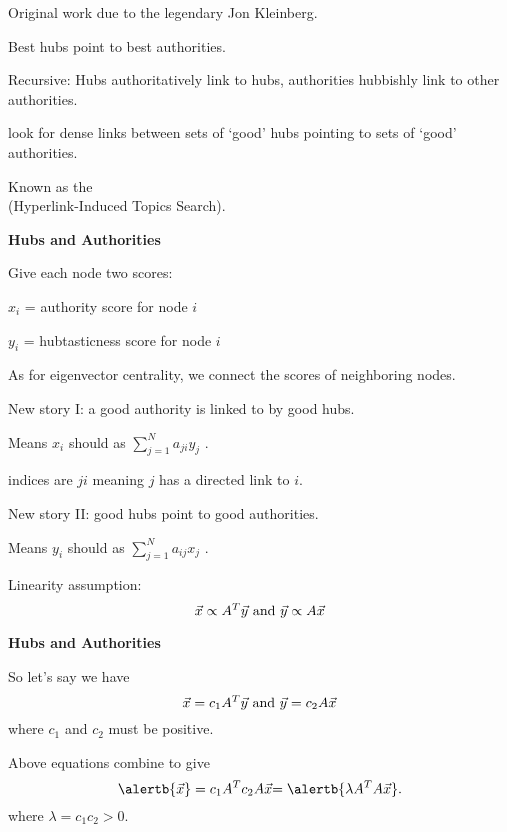    Original work due to 
    the legendary Jon Kleinberg.\cite{kleinberg1998a}
  
    Best hubs point to best authorities.
  
    \alert{Recursive:} 
    Hubs authoritatively link to hubs, 
    authorities hubbishly link to other authorities.
  
     look for dense links
    between sets of `good' hubs pointing to sets of 
    `good' authorities.
  
    Known as the
    \\
    (Hyperlink-Induced Topics Search).
  


  \textbf{Hubs and Authorities}

  
  
    Give each node two scores:
    
     
      \alert{$x_i$} = \alert{authority score} for node $i$
     
      \alert{$y_i$} = \alert{hubtasticness score} for node $i$
    
  
    As for eigenvector centrality, we connect
    the scores of neighboring nodes.
  
    New story I: a good authority is linked to by good hubs.
  
    Means
    \alert{$x_i$} should  as
    \alert{$\sum_{j=1}^{N} a_{ji} y_j$} .
  
     indices are $ji$ meaning
    $j$ has a directed link to $i$.
  
    New story II: good hubs point to good authorities.
  
    Means
    \alert{$y_i$} should  as
    \alert{$\sum_{j=1}^{N} a_{ij} x_j$} .
  
    Linearity assumption:
    $$
    \vec{x} \propto A^{T} \vec{y}
    \ \textnormal{and} \
    \vec{y} \propto A \vec{x}
    $$
  


  \textbf{Hubs and Authorities}
  
  
  
    So let's say we have
    $$
    \vec{x} = c_1 A^{T} \vec{y}
    \ \textnormal{and} \
    \vec{y} = c_2 A \vec{x}
    $$
    where $c_1$ and $c_2$ must be positive.
  
    Above equations combine to give
    $$
    \alertb{\vec{x}} = c_1 A^{T} c_2 A \vec{x}
    { 
      =
      \alertb{\lambda A^{T} A \vec{x}}.
    }
    $$
    where $\lambda = c_1c_2 > 0$.
  
